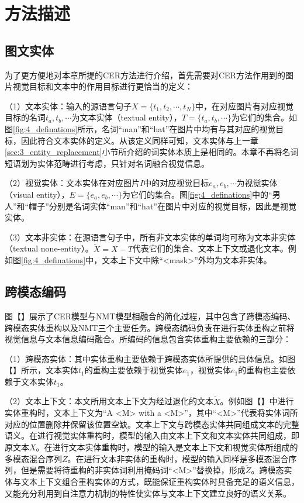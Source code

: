 \section{方法描述}

\subsection{图文实体}
\label{sec:4_entities}

为了更方便地对本章所提的CER方法进行介绍，首先需要对CER方法作用到的图片视觉目标和文本中的作用目标进行更恰当的定义：

（1）{\sffamily 文本实体：}输入的源语言句子$X=\{t_1,t_2,\cdots,t_N\}$中，在对应图片有对应视觉目标的名词$t_a,t_b,\cdots$为文本实体（textual entity），$T=\{t_a,t_b,\cdots\}$为它们的集合。如图\ref{fig:4_definations}所示，名词“man”和“hat”在图片中均有与其对应的视觉目标，因此符合文本实体的定义。从该定义同样可知，文本实体与上一章\ref{sec:3_entity_replacement}小节所介绍的词实体本质上是相同的。本章不再将名词短语划为实体范畴进行考虑，只针对名词融合视觉信息。

（2）{\sffamily 视觉实体：}文本实体在对应图片$I$中的对应视觉目标${e_a,e_b,\cdots}$为视觉实体（visual entity），$E=\{e_a,e_b,\cdots\}$为它们的集合。图\ref{fig:4_definations}中的“男人”和“帽子”分别是名词实体“man”和“hat”在图片中对应的视觉目标，因此是视觉实体。

（3）{\sffamily 文本非实体：}在源语言句子中，所有非文本实体的单词均可称为文本非实体（textual none-entity）。$\tilde{X}=X-T$代表它们的集合、文本上下文或退化文本。例如图\ref{fig:4_definations}中，文本上下文中除“<mask>”外均为文本非实体。

\subsection{跨模态编码}
图【】展示了CER模型与NMT模型相融合的简化过程，其中包含了跨模态编码、跨模态实体重构以及NMT三个主要任务。跨模态编码负责在进行实体重构之前将视觉信息与文本信息编码融合。所编码的信息包含实体重构主要依赖的三部分：

（1）{\sffamily 跨模态实体：}其中实体重构主要依赖于跨模态实体所提供的具体信息。如图【】所示，文本实体$t_1$的重构主要依赖于视觉实体$e_1$，视觉实体$e_1$的重构也主要依赖于文本实体$t_1$。

（2）{\sffamily 文本上下文：}本文所用文本上下文为经过退化的文本$\tilde{X}$。例如图【】中进行实体重构时，文本上下文为“A <M> with a <M>”，其中“<M>”代表将实体词所对应的位置删除并保留该位置空缺。文本上下文与跨模态实体共同组成文本的完整语义。在进行视觉实体重构时，模型的输入由文本上下文和文本实体共同组成，即原文本$X$。在进行文本实体重构时，模型的输入是文本上下文和视觉实体所组成的多模态混合序列$Z$。在进行文本非实体的重构时，模型的输入同样是多模态混合序列，但是需要将待重构的非实体词利用掩码词“<M>”替换掉，形成$\tilde{Z}$。跨模态实体与文本上下文组合重构实体的方式，既能保证重构实体时具备充足的语义信息，又能充分利用到自注意力机制的特性使实体与文本上下文建立良好的语义关系。

